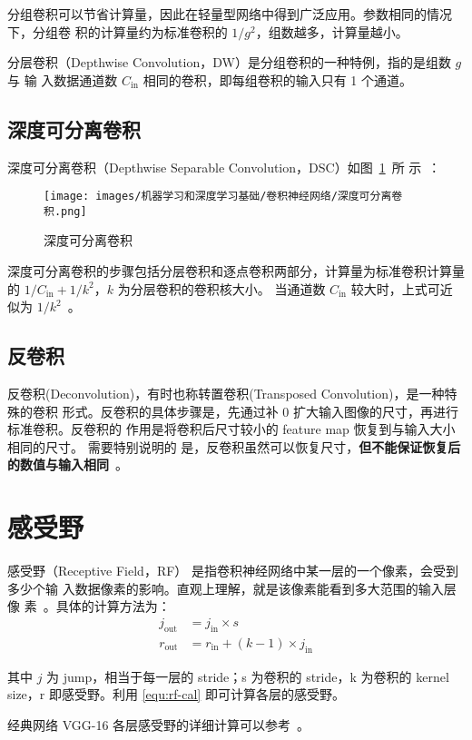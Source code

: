 分组卷积可以节省计算量，因此在轻量型网络中得到广泛应用。参数相同的情况下，分组卷
积的计算量约为标准卷积的 $ 1 / g^2 $，组数越多，计算量越小。

分层卷积（Depthwise Convolution，DW）是分组卷积的一种特例，指的是组数 $g$ 与 输
入数据通道数 $C_{\mathrm{in}}$ 相同的卷积，即每组卷积的输入只有 1 个通道。

\subsection{深度可分离卷积}

深度可分离卷积（Depthwise Separable Convolution，DSC）如图~\ref{fig:ds-conv}~所
示~：

\begin{figure}[ht]
  \centering
  \texttt{[image: images/机器学习和深度学习基础/卷积神经网络/深度可分离卷积.png]}
  \caption{深度可分离卷积}
  \label{fig:ds-conv}
\end{figure}

深度可分离卷积的步骤包括分层卷积和逐点卷积两部分，计算量为标准卷积计算量的 $ 1 /
C_{\mathrm{in}} + 1/k^2 $，$k$ 为分层卷积的卷积核大小。
当通道数 $C_{\mathrm{in}}$ 较大时，上式可近似为 $1 / k^2$~。

\subsection{反卷积}
\label{subsec:deconv}

反卷积(Deconvolution)，有时也称转置卷积(Transposed Convolution)，是一种特殊的卷积
形式。反卷积的具体步骤是，先通过补 0 扩大输入图像的尺寸，再进行标准卷积。反卷积的
作用是将卷积后尺寸较小的 feature map 恢复到与输入大小相同的尺寸。 需要特别说明的
是，反卷积虽然可以恢复尺寸，\textbf{但不能保证恢复后的数值与输入相同}~。

\section{感受野}

感受野（Receptive Field，RF） 是指卷积神经网络中某一层的一个像素，会受到多少个输
入数据像素的影响。直观上理解，就是该像素能看到多大范围的输入层像
素~。具体的计算方法为：
\begin{align}
\label{equ:rf-cal}
j_{\mathrm {out}} & = j_{\mathrm{in}} \times s \\
r_{\mathrm {out}} & = r_{\mathrm{in}} + (k-1) \times j_{\mathrm{in}}
\end{align}

其中 $j$ 为 jump，相当于每一层的 stride；s 为卷积的 stride，k 为卷积的 kernel
size，r 即感受野。利用 \eqref{equ:rf-cal} 即可计算各层的感受野。

经典网络 VGG-16 各层感受野的详细计算可以参考~。

